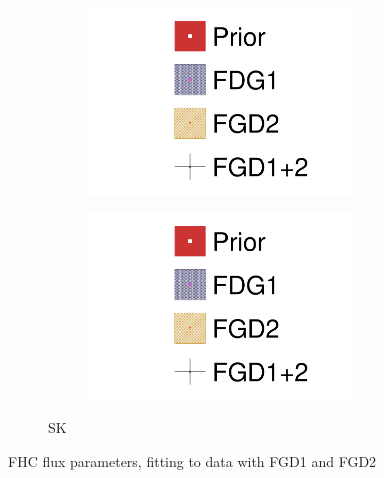 \begin{figure}[h]
\begin{subfigure}[t]{\textwidth}
\begin{subfigure}[t]{0.24\textwidth}
			\includegraphics[width=\textwidth,page=12, trim={0mm 0mm 0mm 9mm}, clip]{figures/mach3/2018/data/2018a_FixedCov_RedCov_Mpi_FGD1Only_Data_merge_2018a_FixedCov_RedCov_Mpi_FGD2Only_Data_merge_2018a_FixedCov_RedCov_Mpi_Data_merge}
		\end{subfigure}
		\begin{subfigure}[t]{0.24\textwidth}
			\includegraphics[width=\textwidth,page=13, trim={0mm 0mm 0mm 9mm}, clip]{figures/mach3/2018/data/2018a_FixedCov_RedCov_Mpi_FGD1Only_Data_merge_2018a_FixedCov_RedCov_Mpi_FGD2Only_Data_merge_2018a_FixedCov_RedCov_Mpi_Data_merge}
		\end{subfigure}
		\caption{SK}
	\end{subfigure}
	
	\caption{FHC flux parameters, fitting to data with FGD1 and FGD2}
	\label{fig:data_fdg1vsfgd2_2018_fhc}
\end{figure}

